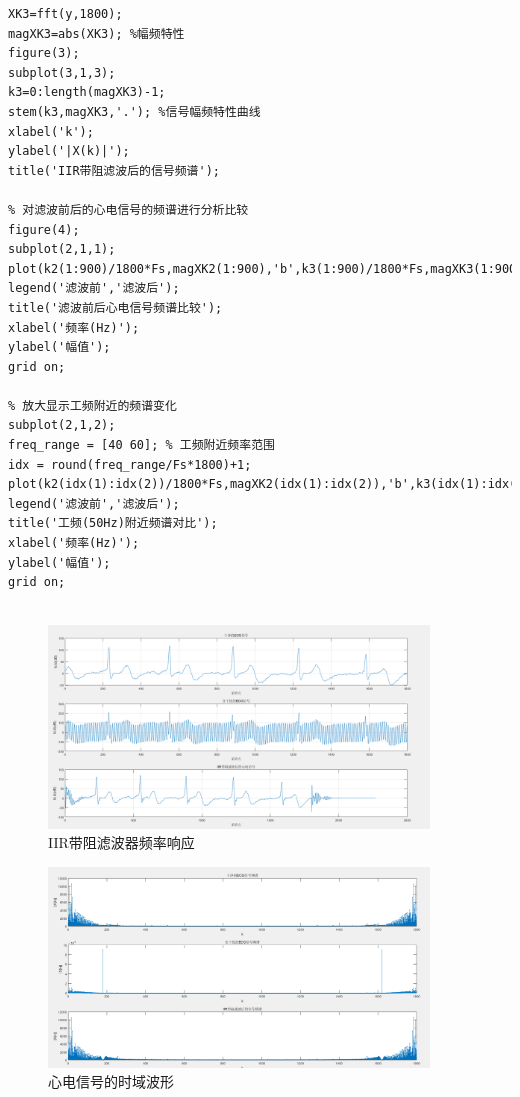 \documentclass[12pt,hyperref,a4paper,UTF8]{ctexart}
\begin{document}
\begin{lstlisting}[style=matlab, caption={ MATLAB实现代码}]
% 计算并展示滤波后信号的频谱
XK3=fft(y,1800);
magXK3=abs(XK3); %幅频特性
figure(3);
subplot(3,1,3);
k3=0:length(magXK3)-1;
stem(k3,magXK3,'.'); %信号幅频特性曲线
xlabel('k');
ylabel('|X(k)|');
title('IIR带阻滤波后的信号频谱');

% 对滤波前后的心电信号的频谱进行分析比较
figure(4);
subplot(2,1,1);
plot(k2(1:900)/1800*Fs,magXK2(1:900),'b',k3(1:900)/1800*Fs,magXK3(1:900),'r');
legend('滤波前','滤波后');
title('滤波前后心电信号频谱比较');
xlabel('频率(Hz)');
ylabel('幅值');
grid on;

% 放大显示工频附近的频谱变化
subplot(2,1,2);
freq_range = [40 60]; % 工频附近频率范围
idx = round(freq_range/Fs*1800)+1;
plot(k2(idx(1):idx(2))/1800*Fs,magXK2(idx(1):idx(2)),'b',k3(idx(1):idx(2))/1800*Fs,magXK3(idx(1):idx(2)),'r');
legend('滤波前','滤波后');
title('工频(50Hz)附近频谱对比');
xlabel('频率(Hz)');
ylabel('幅值');
grid on;


\end{lstlisting}


\begin{figure}[H] %
        \centering
        \includegraphics[width=0.9\textwidth]{figures/3_1.png} %
        \caption{IIR带阻滤波器频率响应} %
        \label{fig:3_1} %
\end{figure}

\begin{figure}[H] %
        \centering
        \includegraphics[width=0.9\textwidth]{figures/3_2.png} %
        \caption{心电信号的时域波形} %
        \label{fig:3_2} %
\end{figure}
\end{document}
